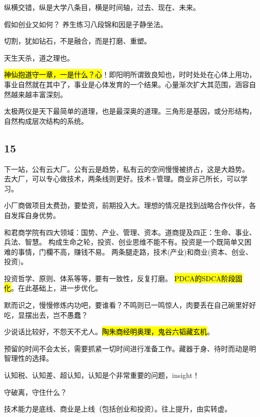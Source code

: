 纵横交错，纵是大学八条目，横是时间轴，过去、现在、未来。

假如创业又如何？ 养生练习八段锦和因是子静坐法。

切割，犹如钻石，不是融合，而是打磨、重塑。

天生天杀，道之理也。

\hl{神仙抱道守一章，一是什么？心}！即阳明所谓致良知也，时时处处在心体上用功，
事业自然就在其中了，事业是心体发育的一个结果。心量渐次扩大其范围，涵容自然越来越丰富深刻。

太极两仪是天下最简单的道理，也是最深奥的道理。三角形是基因，或分形结构，自然构成层次结构的系统。

\subsection{15}

下一站，公有云大厂。公有云是趋势，私有云的空间慢慢被挤占，这是大趋势。
去大厂，可以专心做技术，两条线则更好。技术+管理。商业非己所长，可以学习。

小厂商做项目太费劲，要垫资，前期投入大。理想的情况是找到战略合作伙伴，各自发挥自身优势。

和君商学院有四大领域：国势、产业、管理、资本。道商提及四正：生命、事业、兵法、智慧。
构成生命之轮，投资、创业思维不能不有。投资是一个既简单又困难的事情，门欄不高，赚钱不易。
两条腿走路，技术(产业)和商业(资本、创业、投资)。

投资哲学、原则、体系等等，要有一致性，反复打磨。
\hl{PDCA的SDCA阶段固化}。在此基础上，进一步优化。

默而识之，慢慢修炼内功吧，要谁看？不鸣则已一鸣惊人，肉要丢在自己碗里好好吃，显摆出去，岂不愚蠢？

少说话比较好，不怨天不尤人。\hl{陶朱商经明奥理，鬼谷六韬藏玄机}。

预留的时间不会太长，需要抓紧一切时间进行准备工作。藏器于身、待时而动是明智理性的选择。

认知税、认知差、超认知，认知是个非常重要的问题，insight！

守破离，守住什么？

技术能力是底线、商业是上线（包括创业和投资）。往上提升，由实转虚。
